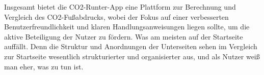 Insgesamt bietet die CO2-Runter-App eine Plattform zur Berechnung und Vergleich des CO2-Fußabdrucks, wobei der Fokus auf einer verbesserten Benutzerfreundlichkeit und klaren Handlungsanweisungen liegen sollte, um die aktive Beteiligung der Nutzer zu fördern. Was am meisten auf der Startseite auffällt. Denn die Struktur und Anordnungen der Unterseiten sehen im Vergleich zur Startseite wesentlich strukturierter und organisierter aus, und als Nutzer weiß man eher, was zu tun ist.
